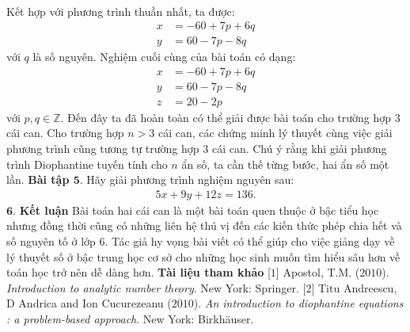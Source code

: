 \begin{multicols}{2}
\begin{align*}
	\end{align*}
	Kết hợp với phương trình thuần nhất, ta được:
	\begin{align*}
		x&=-60+7p+6q\\
		y&=60-7p-8q
	\end{align*}
	với $q$ là số nguyên.
	\vskip 0.1cm
	Nghiệm cuối cùng của bài toán có dạng:
	\begin{align*}
		x&=-60+7p+6q\\
		y&=60-7p-8q\\
		z&=20-2p
	\end{align*}
	với $p,q \in \mathbb{Z}$.
	\vskip 0.1cm
	Đến đây ta đã hoàn toàn có thể giải được bài toán cho trường hợp $3$ cái can.
	\vskip 0.1cm
	Cho trường hợp $n>3$ cái can, các chứng minh lý thuyết cùng việc giải phương trình cũng tương tự trường hợp $3$ cái can. Chú ý rằng khi giải phương trình Diophantine tuyến tính cho $n$ ẩn số, ta cần thế từng bước, hai ẩn số một lần.
	\vskip 0.1cm
	\textbf{\color{hoccungpi}Bài tập $\pmb{5.}$}
	Hãy giải phương trình nghiệm nguyên sau:
	\begin{align*}
		5x+9y+12z=136.
	\end{align*}
	$\pmb{6.}$ \textbf{\color{hoccungpi}Kết luận}
	\vskip 0.1cm
	Bài toán hai cái can là một bài toán quen thuộc ở bậc tiểu học nhưng đồng thời cũng có những liên hệ thú vị đến các kiến thức phép chia hết và số nguyên tố ở lớp $6$. Tác giả hy vọng bài viết có thể giúp cho việc giảng dạy về lý thuyết số ở bậc trung học cơ sở cho những học sinh muốn tìm hiểu sâu hơn về toán học trở nên dễ dàng hơn.
	\vskip 0.1cm
	\textbf{\color{hoccungpi}Tài liệu tham khảo}
	\vskip 0.1cm
	[$1$] Apostol, T.M. ($2010$). \textit{Introduction to analytic number theory}. New York: Springer.
	\vskip 0.1cm
	[$2$] Titu Andreescu, D Andrica and Ion Cucurezeanu ($2010$). \textit{An introduction to diophantine equations : a problem-based approach}. New York: Birkhäuser.
\end{multicols}